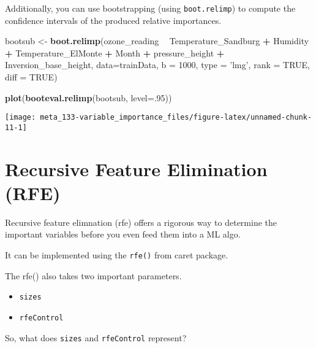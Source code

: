 \documentclass[]{book}
\newenvironment{Shaded}{\begin{snugshade}}{\end{snugshade}}
\newcommand{\DataTypeTok}[1]{\textcolor[rgb]{0.13,0.29,0.53}{#1}}
\newcommand{\DecValTok}[1]{\textcolor[rgb]{0.00,0.00,0.81}{#1}}
\newcommand{\KeywordTok}[1]{\textcolor[rgb]{0.13,0.29,0.53}{\textbf{#1}}}
\newcommand{\NormalTok}[1]{#1}
\newcommand{\OperatorTok}[1]{\textcolor[rgb]{0.81,0.36,0.00}{\textbf{#1}}}
\newcommand{\OtherTok}[1]{\textcolor[rgb]{0.56,0.35,0.01}{#1}}
\newcommand{\StringTok}[1]{\textcolor[rgb]{0.31,0.60,0.02}{#1}}
\providecommand{\tightlist}{%
  \setlength{\itemsep}{0pt}\setlength{\parskip}{0pt}}
\begin{document}
Additionally, you can use bootstrapping (using \texttt{boot.relimp}) to compute the confidence intervals of the produced relative importances.

\begin{Shaded}
\begin{Highlighting}[]
\NormalTok{bootsub <-}\StringTok{ }\KeywordTok{boot.relimp}\NormalTok{(ozone_reading }\OperatorTok{~}\StringTok{ }\NormalTok{Temperature_Sandburg }\OperatorTok{+}\StringTok{ }\NormalTok{Humidity }\OperatorTok{+}\StringTok{ }\NormalTok{Temperature_ElMonte }\OperatorTok{+}\StringTok{ }\NormalTok{Month }\OperatorTok{+}\StringTok{ }\NormalTok{pressure_height }\OperatorTok{+}\StringTok{ }\NormalTok{Inversion_base_height, }\DataTypeTok{data=}\NormalTok{trainData,}
                       \DataTypeTok{b =} \DecValTok{1000}\NormalTok{, }\DataTypeTok{type =} \StringTok{'lmg'}\NormalTok{, }\DataTypeTok{rank =} \OtherTok{TRUE}\NormalTok{, }\DataTypeTok{diff =} \OtherTok{TRUE}\NormalTok{)}

\KeywordTok{plot}\NormalTok{(}\KeywordTok{booteval.relimp}\NormalTok{(bootsub, }\DataTypeTok{level=}\NormalTok{.}\DecValTok{95}\NormalTok{))}
\end{Highlighting}
\end{Shaded}

\begin{center}\texttt{[image: meta\_133-variable\_importance\_files/figure-latex/unnamed-chunk-11-1]} \end{center}

\hypertarget{recursive-feature-elimination-rfe}{%
\section{Recursive Feature Elimination (RFE)}\label{recursive-feature-elimination-rfe}}

Recursive feature elimnation (rfe) offers a rigorous way to determine the important variables before you even feed them into a ML algo.

It can be implemented using the \texttt{rfe()} from caret package.

The rfe() also takes two important parameters.

\begin{itemize}
\tightlist
\item
  \texttt{sizes}
\item
  \texttt{rfeControl}
\end{itemize}

So, what does \texttt{sizes} and \texttt{rfeControl} represent?
\end{document}
